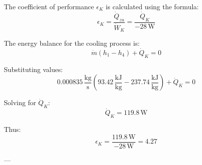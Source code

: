 The coefficient of performance \( \epsilon_K \) is calculated using the formula:
\[
\epsilon_K = \frac{\dot{Q}_{zu}}{\dot{W}_K} = \frac{\dot{Q}_K}{-28 \, \text{W}}
\]

The energy balance for the cooling process is:
\[
\dot{m}(h_1 - h_4) + \dot{Q}_K = 0
\]

Substituting values:
\[
0.000835 \, \frac{\text{kg}}{\text{s}} \left( 93.42 \, \frac{\text{kJ}}{\text{kg}} - 237.74 \, \frac{\text{kJ}}{\text{kg}} \right) + \dot{Q}_K = 0
\]

Solving for \( \dot{Q}_K \):
\[
\dot{Q}_K = 119.8 \, \text{W}
\]

Thus:
\[
\epsilon_K = \frac{119.8 \, \text{W}}{-28 \, \text{W}} = 4.27
\]

---